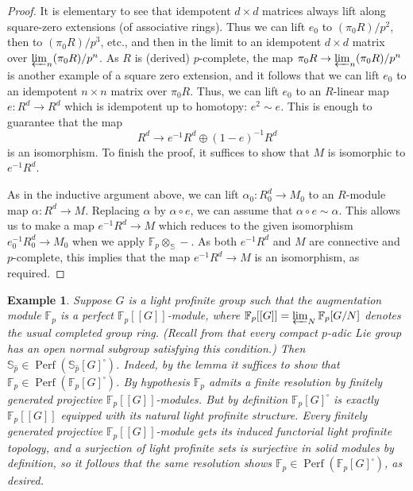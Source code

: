 \documentclass[12pt]{article}
\newtheorem{example}[theorem]{Example}
\newcommand{\on}{\operatorname}
\newcommand{\solid}{\square}
\newcommand{\wh}{\widehat}
\begin{document}
\begin{proof}
It is elementary to see that idempotent $d\times d$ matrices always lift along square-zero extensions (of associative rings).  Thus we can lift $e_0$ to $(\pi_0R)/p^2$, then to $(\pi_0R)/p^3$, etc., and then in the limit to an idempotent $d\times d$ matrix over $\varprojlim_n (\pi_0R)/p^n$.  As $R$ is (derived) $p$-complete, the map $\pi_0R \to \varprojlim_n (\pi_0R)/p^n$ is another example of a square zero extension, and it follows that we can lift $e_0$ to an idempotent $n\times n$ matrix over $\pi_0R$.  Thus, we can lift $e_0$ to an $R$-linear map $e:R^d\to R^d$ which is idempotent up to homotopy: $e^2\sim e$.  This is enough to guarantee that the map
$$R^d \to e^{-1}R^d \oplus (1-e)^{-1}R^d$$
is an isomorphism.  To finish the proof, it suffices to show that $M$ is isomorphic to $e^{-1}R^d$.

As in the inductive argument above, we can lift $\alpha_0:R_0^d\to M_0$ to an $R$-module map $\alpha:R^d\to M$.  Replacing $\alpha$ by $\alpha\circ e$, we can assume that $\alpha\circ e \sim \alpha$.  This allows us to make a map $e^{-1}R^d\to M$ which reduces to the given isomorphism $e_0^{-1}R_0^d\to M_0$ when we apply $\mathbb{F}_p\otimes_\mathbb{S}-$.  As both $e^{-1}R^d$ and $M$ are connective and $p$-complete, this implies that the map $e^{-1}R^d\to M$ is an isomorphism, as required.
\end{proof}

\begin{example}\label{perfexample}
Suppose $G$ is a light profinite group such that the augmentation module $\mathbb{F}_p$ is a perfect $\mathbb{F}_p[[G]]$-module, where $\mathbb{F}_p[[G]]=\varprojlim_N \mathbb{F}_p[G/N]$ denotes the usual completed group ring.  (Recall from \cite{LazardGroupes} that every compact $p$-adic Lie group has an open normal subgroup satisfying this condition.)
Then $\mathbb{S}_{\wh{p}}\in\on{Perf}(\mathbb{S}_{\wh{p}}[G]^\solid)$.  Indeed, by the lemma it suffices to show that $\mathbb{F}_p\in\on{Perf}(\mathbb{F}_p[G]^\solid)$.  By hypothesis $\mathbb{F}_p$ admits a finite resolution by finitely generated projective $\mathbb{F}_p[[G]]$-modules.  But by definition $\mathbb{F}_p[G]^\solid$ is exactly $\mathbb{F}_p[[G]]$ equipped with its natural light profinite structure.  Every finitely generated projective $\mathbb{F}_p[[G]]$-module gets its induced functorial light profinite topology, and a surjection of light profinite sets is surjective in solid modules by definition, so it follows that the same resolution shows $\mathbb{F}_p\in\on{Perf}(\mathbb{F}_p[G]^\solid)$, as desired.
\end{example}
\end{document}
